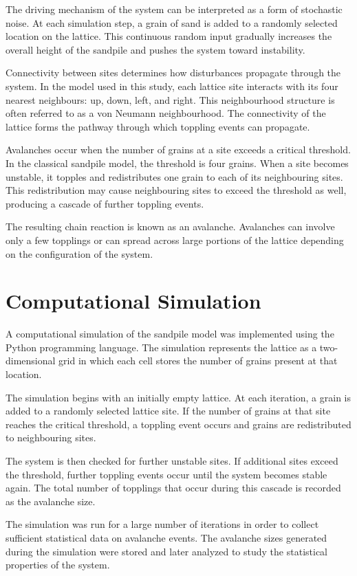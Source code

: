 \documentclass[12pt]{article}
\begin{document}
The driving mechanism of the system can be interpreted as a form of stochastic noise. At each simulation step, a grain of sand is added to a randomly selected location on the lattice. This continuous random input gradually increases the overall height of the sandpile and pushes the system toward instability.

Connectivity between sites determines how disturbances propagate through the system. In the model used in this study, each lattice site interacts with its four nearest neighbours: up, down, left, and right. This neighbourhood structure is often referred to as a von Neumann neighbourhood. The connectivity of the lattice forms the pathway through which toppling events can propagate.

Avalanches occur when the number of grains at a site exceeds a critical threshold. In the classical sandpile model, the threshold is four grains. When a site becomes unstable, it topples and redistributes one grain to each of its neighbouring sites. This redistribution may cause neighbouring sites to exceed the threshold as well, producing a cascade of further toppling events.

The resulting chain reaction is known as an avalanche. Avalanches can involve only a few topplings or can spread across large portions of the lattice depending on the configuration of the system.

\section{Computational Simulation}

A computational simulation of the sandpile model was implemented using the Python programming language. The simulation represents the lattice as a two-dimensional grid in which each cell stores the number of grains present at that location.

The simulation begins with an initially empty lattice. At each iteration, a grain is added to a randomly selected lattice site. If the number of grains at that site reaches the critical threshold, a toppling event occurs and grains are redistributed to neighbouring sites.

The system is then checked for further unstable sites. If additional sites exceed the threshold, further toppling events occur until the system becomes stable again. The total number of topplings that occur during this cascade is recorded as the avalanche size.

The simulation was run for a large number of iterations in order to collect sufficient statistical data on avalanche events. The avalanche sizes generated during the simulation were stored and later analyzed to study the statistical properties of the system.
\end{document}

